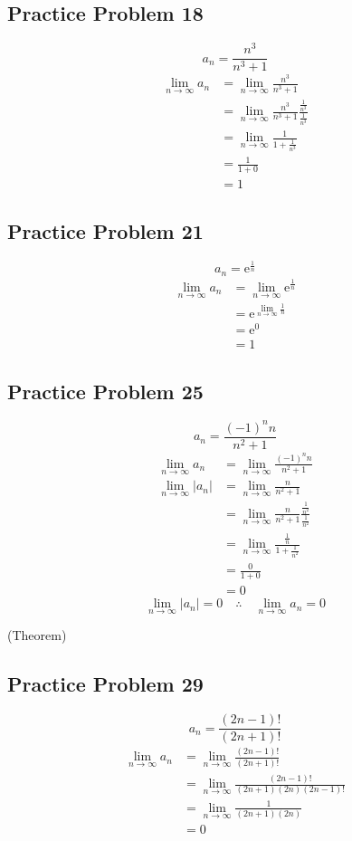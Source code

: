 \documentclass[letterpaper, 12pt]{article}
\newcommand*{\e}{\mathrm{e}}
\begin{document}
\subsection*{Practice Problem 18}
\[ a_{n} = \frac{n^{3}}{n^{3}+1} \]
\begin{align*}
  \lim_{n\to\infty}{a_{n}} &= \lim_{n\to\infty}{\frac{n^{3}}{n^{3}+1}} \\
  &= \lim_{n\to\infty}
    {\frac{n^{3}}{n^{3}+1}\frac{\frac{1}{n^{3}}}{\frac{1}{n^{3}}}} \\
  &= \lim_{n\to\infty}{\frac{1}{1+\frac{1}{n^{3}}}} \\
  &= \frac{1}{1+0} \\
  &= 1
\end{align*}

\subsection*{Practice Problem 21}
\[ a_{n} = \e^{\frac{1}{n}} \]
\begin{align*}
  \lim_{n\to\infty}{a_{n}} &= \lim_{n\to\infty}{\e^{\frac{1}{n}}} \\
  &= \e^{\lim_{n\to\infty}{\frac{1}{n}}} \\
  &= \e^{0} \\
  &= 1
\end{align*}

\subsection*{Practice Problem 25}
\[ a_{n} = \frac{(-1)^{n}n}{n^{2}+1} \]
\begin{align*}
  \lim_{n\to\infty}{a_{n}} &= \lim_{n\to\infty}{\frac{(-1)^{n}n}{n^{2}+1}} \\
  \lim_{n\to\infty}{|a_{n}|} &= \lim_{n\to\infty}{\frac{n}{n^{2}+1}} \\
  &= \lim_{n\to\infty}
    {\frac{n}{n^{2}+1}\frac{\frac{1}{n^{2}}}{\frac{1}{n^{2}}}} \\
  &= \lim_{n\to\infty}
    {\frac{\frac{1}{n}}{1+\frac{1}{n^{2}}}} \\
  &= \frac{0}{1+0} \\
  &= 0
\end{align*}
\[ \lim_{n\to\infty}{|a_{n}|} = 0 \quad \therefore \quad
   \lim_{n\to\infty}{a_{n}} = 0 \]
\begin{center}
  (Theorem)
\end{center}

\subsection*{Practice Problem 29}
\[ a_{n} = \frac{(2n-1)!}{(2n+1)!} \]
\begin{align*}
  \lim_{n\to\infty}{a_{n}} &= \lim_{n\to\infty}{\frac{(2n-1)!}{(2n+1)!}} \\
  &= \lim_{n\to\infty}{\frac{(2n-1)!}{(2n+1)(2n)(2n-1)!}} \\
  &= \lim_{n\to\infty}{\frac{1}{(2n+1)(2n)}} \\
  &= 0
\end{align*}
\end{document}
